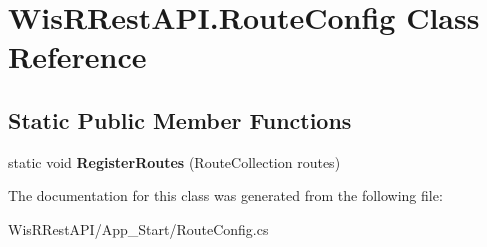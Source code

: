 \hypertarget{class_wis_r_rest_a_p_i_1_1_route_config}{}\section{Wis\+R\+Rest\+A\+P\+I.\+Route\+Config Class Reference}
\label{class_wis_r_rest_a_p_i_1_1_route_config}
\subsection*{Static Public Member Functions}
\begin{DoxyCompactItemize}
\item 
\hypertarget{class_wis_r_rest_a_p_i_1_1_route_config_aeddceddc3ac3b6352c2352df80d05ad2}{}static void {\bfseries Register\+Routes} (Route\+Collection routes)\label{class_wis_r_rest_a_p_i_1_1_route_config_aeddceddc3ac3b6352c2352df80d05ad2}

\end{DoxyCompactItemize}


The documentation for this class was generated from the following file\+:\begin{DoxyCompactItemize}
\item 
Wis\+R\+Rest\+A\+P\+I/\+App\+\_\+\+Start/Route\+Config.\+cs\end{DoxyCompactItemize}
